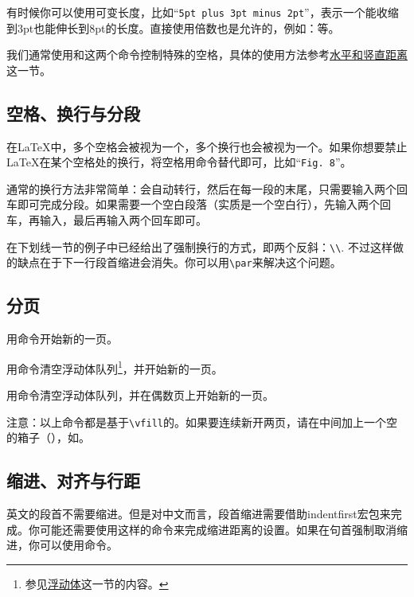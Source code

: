 {有时候你可以使用可变长度，比如“\texttt{5pt plus 3pt minus 2pt}”，表示一个能收缩到3pt也能伸长到8pt的长度。直接使用倍数也是允许的，例如：等。

我们通常使用\latexline{\\hspace{len}}和\latexline{\\vspace{len}}这两个命令控制特殊的空格，具体的使用方法参考\hyperref[sec:hvspace]{水平和竖直距离}这一节。

\subsection{空格、换行与分段}
在\LaTeX 中，多个空格会被视为一个，多个换行也会被视为一个。如果你想要禁止\LaTeX 在某个空格处的换行，将空格用\texttt{}命令替代即可，比如“\texttt{Fig. 8}”。

通常的换行方法非常简单：会自动转行，然后在每一段的末尾，只需要输入两个回车即可完成分段。如果需要一个空白段落（实质是一个空白行），先输入两个回车，再输入\latexline{\\mbox{}}，最后再输入两个回车即可。

在下划线一节的例子中已经给出了强制换行的方式，即两个反斜：\verb|\\|. 不过这样做的缺点在于下一行段首缩进会消失。你可以用\verb|\par|来解决这个问题。

\subsection{分页}
用\latexline{\\newpage}命令开始新的一页。

用\latexline{\\clearpage}命令清空浮动体队列\footnote{参见\hyperref[sec:float]{浮动体}这一节的内容。}，并开始新的一页。

用\latexline{\\cleardoublepage}命令清空浮动体队列，并在偶数页上开始新的一页。

注意：以上命令都是基于\verb|\vfill|的。如果要连续新开两页，请在中间加上一个空的箱子（\latexline{\\mbox{}}），如\latexline{\\newpage\\mbox{}\\newpage}。

\subsection{缩进、对齐与行距}
英文的段首不需要缩进。但是对中文而言，段首缩进需要借助indentfirst宏包来完成。你可能还需要使用\latexline{\\setlength{\\indent}{2em}}这样的命令来完成缩进距离的设置。如果在句首强制取消缩进，你可以使用\latexline{\\noindent}命令。

}
